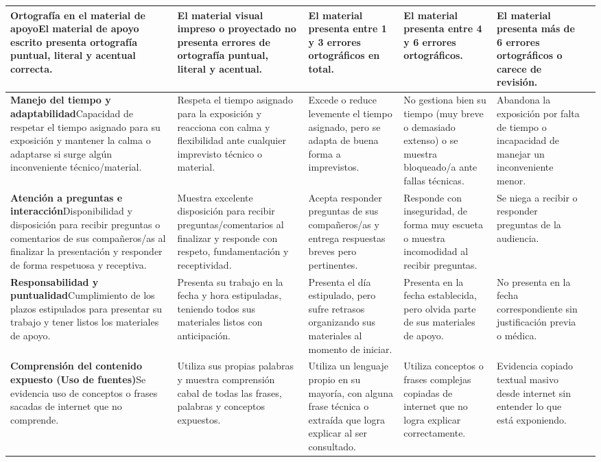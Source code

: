 \documentclass[9pt]{extarticle}
\newcommand{\crit}[2]{\textbf{#1}\newline #2}
\begin{document}
\begin{longtable}{|C{4.9cm}|C{4.45cm}|C{4.45cm}|C{4.45cm}|C{4.45cm}|>{\centering\arraybackslash}p{1.55cm}|}
\crit{Ortografía en el material de apoyo}{El material de apoyo escrito presenta ortografía puntual, literal y acentual correcta.}
& El material visual impreso o proyectado no presenta errores de ortografía puntual, literal y acentual.
& El material presenta entre 1 y 3 errores ortográficos en total.
& El material presenta entre 4 y 6 errores ortográficos.
& El material presenta más de 6 errores ortográficos o carece de revisión.
& \\ \hline

\crit{Manejo del tiempo y adaptabilidad}{Capacidad de respetar el tiempo asignado para su exposición y mantener la calma o adaptarse si surge algún inconveniente técnico/material.}
& Respeta el tiempo asignado para la exposición y reacciona con calma y flexibilidad ante cualquier imprevisto técnico o material.
& Excede o reduce levemente el tiempo asignado, pero se adapta de buena forma a imprevistos.
& No gestiona bien su tiempo (muy breve o demasiado extenso) o se muestra bloqueado/a ante fallas técnicas.
& Abandona la exposición por falta de tiempo o incapacidad de manejar un inconveniente menor.
& \\ \hline

\crit{Atención a preguntas e interacción}{Disponibilidad y disposición para recibir preguntas o comentarios de sus compañeros/as al finalizar la presentación y responder de forma respetuosa y receptiva.}
& Muestra excelente disposición para recibir preguntas/comentarios al finalizar y responde con respeto, fundamentación y receptividad.
& Acepta responder preguntas de sus compañeros/as y entrega respuestas breves pero pertinentes.
& Responde con inseguridad, de forma muy escueta o muestra incomodidad al recibir preguntas.
& Se niega a recibir o responder preguntas de la audiencia.
& \\ \hline

\crit{Responsabilidad y puntualidad}{Cumplimiento de los plazos estipulados para presentar su trabajo y tener listos los materiales de apoyo.}
& Presenta su trabajo en la fecha y hora estipuladas, teniendo todos sus materiales listos con anticipación.
& Presenta el día estipulado, pero sufre retrasos organizando sus materiales al momento de iniciar.
& Presenta en la fecha establecida, pero olvida parte de sus materiales de apoyo.
& No presenta en la fecha correspondiente sin justificación previa o médica.
& \\ \hline

\crit{Comprensión del contenido expuesto (Uso de fuentes)}{Se evidencia uso de conceptos o frases sacadas de internet que no comprende.}
& Utiliza sus propias palabras y muestra comprensión cabal de todas las frases, palabras y conceptos expuestos.
& Utiliza un lenguaje propio en su mayoría, con alguna frase técnica o extraída que logra explicar al ser consultado.
& Utiliza conceptos o frases complejas copiadas de internet que no logra explicar correctamente.
& Evidencia copiado textual masivo desde internet sin entender lo que está exponiendo.
& \\ \hline


\end{longtable}
\end{document}
